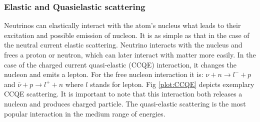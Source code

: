 \subsubsection{Elastic and Quasielastic scattering}
\label{sec:QE}

Neutrinos can elastically interact with the atom's nucleus what leads to their excitation and possible emission of nucleon.
It is as simple as that in the case of the neutral current elastic scattering. Neutrino interacts with the nucleus and frees a proton or neutron, which can later interact with matter more easily.
In the case of the charged current quasi-elastic (CCQE) interaction, it changes the nucleon and emits a lepton.
For the free nucleon interaction it is: $\nu + n \rightarrow l^{-}+p$ and $\bar{\nu} + p \rightarrow l^{+}+n$ where $l$ stands for lepton.
Fig \ref{plot:CCQE} depicts exemplary CCQE scattering. It is important to note that this interaction both releases a nucleon and produces charged particle.
The quasi-elastic scattering is the most popular interaction in the medium range of energies.

